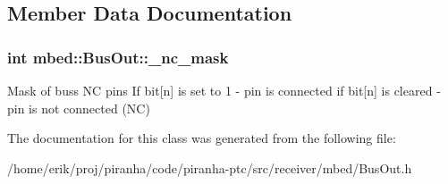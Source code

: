 \subsection{Member Data Documentation}
\subsubsection[{\texorpdfstring{\+\_\+nc\+\_\+mask}{_nc_mask}}]{\setlength{\rightskip}{0pt plus 5cm}int mbed\+::\+Bus\+Out\+::\+\_\+nc\+\_\+mask\hspace{0.3cm}{\ttfamily [protected]}}\hypertarget{classmbed_1_1BusOut_ad044deaa2ea58e94340ee7d2c5b5779a}{}\label{classmbed_1_1BusOut_ad044deaa2ea58e94340ee7d2c5b5779a}
Mask of bus\textquotesingle{}s NC pins If bit\mbox{[}n\mbox{]} is set to 1 -\/ pin is connected if bit\mbox{[}n\mbox{]} is cleared -\/ pin is not connected (NC) 

The documentation for this class was generated from the following file\+:\begin{DoxyCompactItemize}
\item 
/home/erik/proj/piranha/code/piranha-\/ptc/src/receiver/mbed/Bus\+Out.\+h\end{DoxyCompactItemize}

